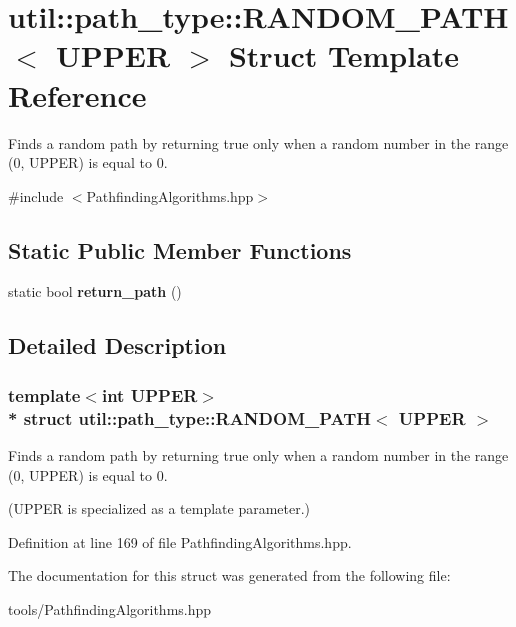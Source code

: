 \hypertarget{structutil_1_1path__type_1_1_r_a_n_d_o_m___p_a_t_h}{}\section{util\+:\+:path\+\_\+type\+:\+:R\+A\+N\+D\+O\+M\+\_\+\+P\+A\+TH$<$ U\+P\+P\+ER $>$ Struct Template Reference}
\label{structutil_1_1path__type_1_1_r_a_n_d_o_m___p_a_t_h}


Finds a random path by returning true only when a random number in the range (0, U\+P\+P\+ER) is equal to 0.  




{\ttfamily \#include $<$Pathfinding\+Algorithms.\+hpp$>$}

\subsection*{Static Public Member Functions}
\begin{DoxyCompactItemize}
\item 
static bool {\bfseries return\+\_\+path} ()\hypertarget{structutil_1_1path__type_1_1_r_a_n_d_o_m___p_a_t_h_a0bd9f0114254e938fd4b9a0f63ddb59f}{}\label{structutil_1_1path__type_1_1_r_a_n_d_o_m___p_a_t_h_a0bd9f0114254e938fd4b9a0f63ddb59f}

\end{DoxyCompactItemize}


\subsection{Detailed Description}
\subsubsection*{template$<$int U\+P\+P\+ER$>$\\*
struct util\+::path\+\_\+type\+::\+R\+A\+N\+D\+O\+M\+\_\+\+P\+A\+T\+H$<$ U\+P\+P\+E\+R $>$}

Finds a random path by returning true only when a random number in the range (0, U\+P\+P\+ER) is equal to 0. 

(U\+P\+P\+ER is specialized as a template parameter.) 

Definition at line 169 of file Pathfinding\+Algorithms.\+hpp.



The documentation for this struct was generated from the following file\+:\begin{DoxyCompactItemize}
\item 
tools/Pathfinding\+Algorithms.\+hpp\end{DoxyCompactItemize}
